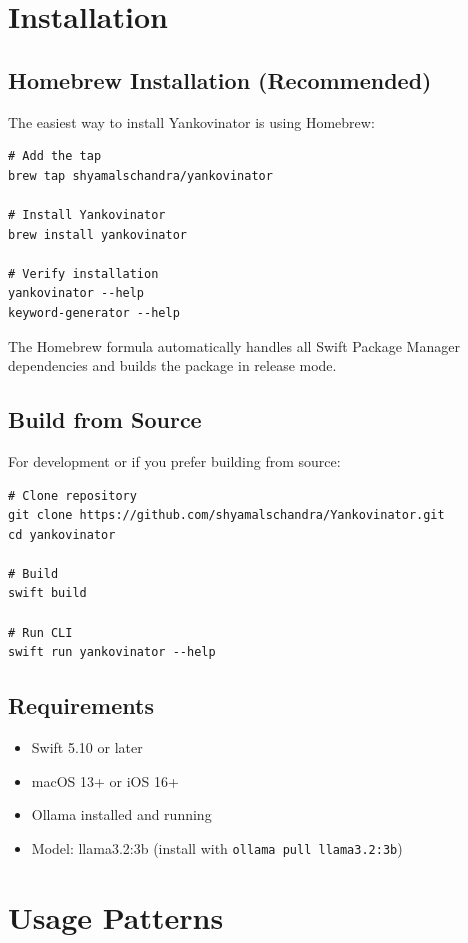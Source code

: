 \documentclass[11pt,a4paper]{article}
\begin{document}
\section{Installation}

\subsection{Homebrew Installation (Recommended)}

The easiest way to install Yankovinator is using Homebrew:

\begin{lstlisting}
# Add the tap
brew tap shyamalschandra/yankovinator

# Install Yankovinator
brew install yankovinator

# Verify installation
yankovinator --help
keyword-generator --help
\end{lstlisting}

The Homebrew formula automatically handles all Swift Package Manager dependencies and builds the package in release mode.

\subsection{Build from Source}

For development or if you prefer building from source:

\begin{lstlisting}
# Clone repository
git clone https://github.com/shyamalschandra/Yankovinator.git
cd yankovinator

# Build
swift build

# Run CLI
swift run yankovinator --help
\end{lstlisting}

\subsection{Requirements}

\begin{itemize}
    \item Swift 5.10 or later
    \item macOS 13+ or iOS 16+
    \item Ollama installed and running
    \item Model: llama3.2:3b (install with \texttt{ollama pull llama3.2:3b})
\end{itemize}

\section{Usage Patterns}
\end{document}
